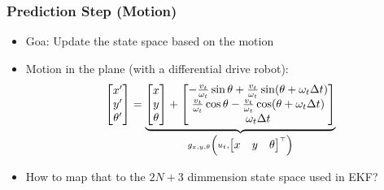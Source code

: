 \begin{frame}
    \frametitle{Prediction Step (Motion)}

    \begin{itemize}
        \item Goa: Update the state space based on the motion
        \item Motion in the plane (with a differential drive robot):
        \begin{equation*}
            \begin{bmatrix} x' \\ y' \\ \theta' \end{bmatrix} = 
            \underbrace{\begin{bmatrix} x \\ y \\ \theta \end{bmatrix} + 
            \begin{bmatrix} 
            -\frac{v_t}{\omega_t} \sin \theta + \frac{v_t}{\omega_t} \sin (\theta + \omega_t \Delta t) \\ 
            \frac{v_t}{\omega_t} \cos \theta - \frac{v_t}{\omega_t} \cos (\theta + \omega_t \Delta t) \\ 
            \omega_t \Delta t 
            \end{bmatrix}}_{g_{x,y,\theta}\left(u_{t}, \begin{bmatrix} x & y & \theta \end{bmatrix}^{\top}\right)}
        \end{equation*}
        \item How to map that to the $2N+3$ dimmension state space used in EKF?
    \end{itemize}

\end{frame}

